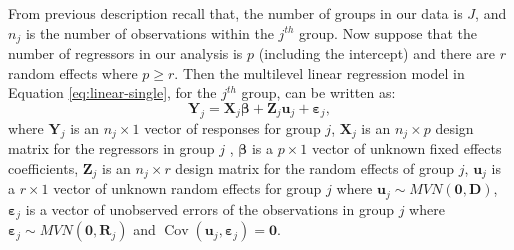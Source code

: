 \documentclass[12pt,oneside,a4paper]{reedthesis}
\begin{document}
From previous description recall that, the number of groups in our data is \(J\), and \(n_j\) is the number of observations within the \(j^{th}\) group. Now suppose that the number of regressors in our analysis is \(p\) (including the intercept) and there are \(r\) random effects where \(p \geq r\).
Then the multilevel linear regression model in Equation \eqref{eq:linear-single}, for the \(j^{th}\) group, can be written as:
\begin{equation}
\mathbf{Y}_{j}=\mathbf{X}_{j} \boldsymbol{\beta}+\mathbf{Z}_{j} \mathbf{u}_{j}+\boldsymbol{\varepsilon}_{j},
\end{equation}
where \(\mathbf{Y}_{j}\) is an \(n_{j} \times 1\) vector of responses for group \(j\),
\(\mathbf{X}_{j}\) is an \(n_{j} \times p\) design matrix for the regressors in group \(j\) ,
\(\boldsymbol{\beta}\) is a \(p \times 1\) vector of unknown fixed effects coefficients,
\(\mathbf{Z}_{j}\) is an \(n_{j} \times r\) design matrix for the random effects of group \(j\),
\(\mathbf{u}_{j}\) is a \(r \times 1\) vector of unknown random effects for group \(j\) where \(\mathbf{u}_{j} \sim M V N(\mathbf{0}, \mathbf{D})\),
\(\boldsymbol{\varepsilon}_{j}\) is a vector of unobserved errors of the observations in group \(j\) where
\(\boldsymbol{\varepsilon}_{j}\sim M V N\left(\mathbf{0}, \mathbf{R}_{j}\right)\) and \(\operatorname{Cov}\left(\mathbf{u}_{j}, \boldsymbol{\varepsilon}_{j}\right)=\mathbf{0}\).
\end{document}
